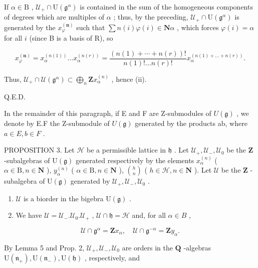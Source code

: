 If \(\alpha \in \mathrm{B}\) , \(\mathcal{U}_{+} \cap \mathrm{U}(\mathfrak{g}^{\alpha})\) is contained in the sum of the homogeneous components of degrees which are multiples of \(\alpha\) ; thus, by the preceding, \(\mathcal{U}_{+} \cap \mathrm{U}(\mathfrak{g}^{\alpha})\) is generated by the \(x_{\varphi}^{(\mathbf{n})}\) such that \(\sum n(i)\varphi(i) \in \mathbf{N}\alpha\) , which forces \(\varphi(i) = \alpha\) for all \(i\) (since B is a basis of R), so

\[
x _ {\varphi} ^ {(\mathbf {n})} = x _ {\alpha} ^ {(n (1))} \dots x _ {\alpha} ^ {(n (r))} = \frac {(n (1) + \cdots + n (r)) !}{n (1) ! \dots n (r) !} x _ {\alpha} ^ {(n (1) + \dots + n (r))}.
\]

Thus, \(\mathcal{U}_{+} \cap \mathcal{U}(\mathfrak{g}^{\alpha}) \subset \bigoplus_{n} \mathbf{Z}x_{\alpha}^{(n)}\) , hence (ii).

Q.E.D.

In the remainder of this paragraph, if E and F are Z-submodules of \(U(\mathfrak{g})\) , we denote by E.F the Z-submodule of \(U(\mathfrak{g})\) generated by the products ab, where \(a \in E, b \in F\) .

PROPOSITION 3. Let \(\mathcal{H}\) be a permissible lattice in \(\mathfrak{h}\) . Let \(\mathcal{U}_{+},\mathcal{U}_{-},\mathcal{U}_{0}\) be the \(\mathbf{Z}\) -subalgebras of \(\mathrm{U}(\mathfrak{g})\) generated respectively by the elements \(x_{\alpha}^{(n)}\) ( \(\alpha \in \mathrm{B}, n \in \mathbf{N}\) ), \(y_{\alpha}^{(n)}\) ( \(\alpha \in \mathrm{B}, n \in \mathbf{N}\) ), \(\binom{h}{n}\) ( \(h \in \mathcal{H}, n \in \mathbf{N}\) ). Let \(\mathcal{U}\) be the \(\mathbf{Z}\) -subalgebra of \(\mathrm{U}(\mathfrak{g})\) generated by \(\mathcal{U}_{+},\mathcal{U}_{-},\mathcal{U}_{0}\) .

\begin{enumerate}
\def\labelenumi{(\roman{enumi})}
\item
  \(\mathcal{U}\) is a biorder in the bigebra \(\mathrm{U}(\mathfrak{g})\) .
\item
  We have \(\mathcal{U} = \mathcal{U}_{-}. \mathcal{U}_{0}. \mathcal{U}_{+}\) , \(\mathcal{U} \cap \mathfrak{h} = \mathcal{H}\) and, for all \(\alpha \in B\) ,
\end{enumerate}

\[
\mathcal {U} \cap \mathfrak {g} ^ {\alpha} = \mathbf {Z} x _ {\alpha}, \quad \mathcal {U} \cap \mathfrak {g} ^ {- \alpha} = \mathbf {Z} y _ {\alpha}.
\]

By Lemma 5 and Prop. 2, \(\mathcal{U}_{+},\mathcal{U}_{-},\mathcal{U}_{0}\) are orders in the \(\mathbf{Q}\) -algebras \(\mathrm{U}(\mathfrak{n}_{+}),\mathrm{U}(\mathfrak{n}_{-}),\mathrm{U}(\mathfrak{h})\) , respectively, and

